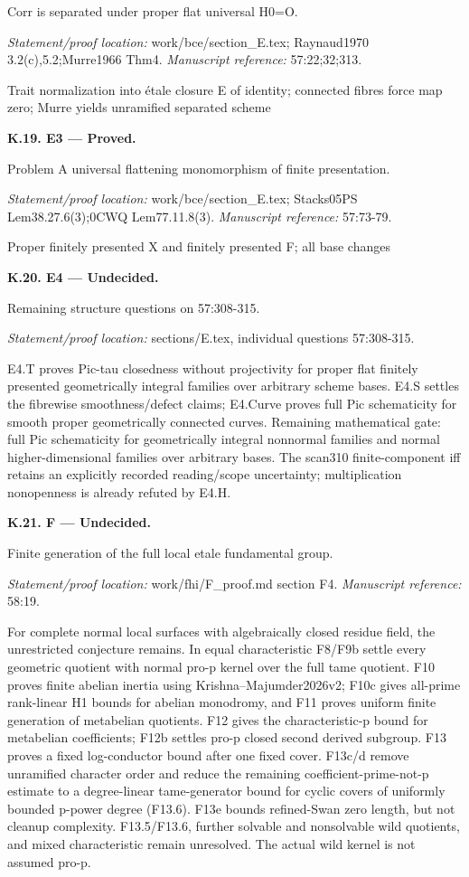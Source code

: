Corr is separated under proper flat universal H0=O.
\par\emph{Statement/proof location:} work/bce/section\_E.tex; Raynaud1970 3.2(c),5.2;Murre1966 Thm4.
\emph{Manuscript reference:} 57:22;32;313.
\par Trait normalization into étale closure E of identity; connected fibres force map zero; Murre yields unramified separated scheme
\par\medskip\noindent\textbf{K.19. E3 --- Proved.}\par
Problem A universal flattening monomorphism of finite presentation.
\par\emph{Statement/proof location:} work/bce/section\_E.tex; Stacks05PS Lem38.27.6(3);0CWQ Lem77.11.8(3).
\emph{Manuscript reference:} 57:73-79.
\par Proper finitely presented X and finitely presented F; all base changes
\par\medskip\noindent\textbf{K.20. E4 --- Undecided.}\par
Remaining structure questions on 57:308-315.
\par\emph{Statement/proof location:} sections/E.tex, individual questions 57:308-315.
\par E4.T proves Pic-tau closedness without projectivity for proper flat finitely presented geometrically integral families over arbitrary scheme bases. E4.S settles the fibrewise smoothness/defect claims; E4.Curve proves full Pic schematicity for smooth proper geometrically connected curves. Remaining mathematical gate: full Pic schematicity for geometrically integral nonnormal families and normal higher-dimensional families over arbitrary bases. The scan310 finite-component iff retains an explicitly recorded reading/scope uncertainty; multiplication nonopenness is already refuted by E4.H.
\par\medskip\noindent\textbf{K.21. F --- Undecided.}\par
Finite generation of the full local etale fundamental group.
\par\emph{Statement/proof location:} work/fhi/F\_proof.md section F4.
\emph{Manuscript reference:} 58:19.
\par For complete normal local surfaces with algebraically closed residue field, the unrestricted conjecture remains. In equal characteristic F8/F9b settle every geometric quotient with normal pro-p kernel over the full tame quotient. F10 proves finite abelian inertia using Krishna–Majumder2026v2; F10c gives all-prime rank-linear H1 bounds for abelian monodromy, and F11 proves uniform finite generation of metabelian quotients. F12 gives the characteristic-p bound for metabelian coefficients; F12b settles pro-p closed second derived subgroup. F13 proves a fixed log-conductor bound after one fixed cover. F13c/d remove unramified character order and reduce the remaining coefficient-prime-not-p estimate to a degree-linear tame-generator bound for cyclic covers of uniformly bounded p-power degree (F13.6). F13e bounds refined-Swan zero length, but not cleanup complexity. F13.5/F13.6, further solvable and nonsolvable wild quotients, and mixed characteristic remain unresolved. The actual wild kernel is not assumed pro-p.
